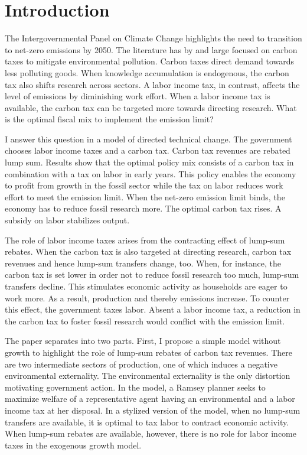 \clearpage
\section{Introduction}

The Intergovernmental Panel on Climate Change highlights the need to transition to net-zero emissions by 2050. The literature has by and large focused on carbon taxes to mitigate environmental pollution. Carbon taxes direct demand towards less polluting goods. When knowledge accumulation is endogenous, the carbon tax also shifts research across sectors. A labor income tax, in contrast, affects the level of emissions by diminishing work effort. When a labor income tax is available, the carbon tax can be targeted more towards directing research. 
What is the optimal fiscal mix to implement the emission limit?

I answer this question in a model of directed technical change. The government chooses labor income taxes and a carbon tax. Carbon tax revenues are rebated lump sum. Results show that the optimal policy mix consists of a carbon tax in combination with a tax on labor in early years. This policy enables the economy to profit from growth in the fossil sector while the tax on labor reduces work effort to meet the emission limit. When the net-zero emission limit binds, the economy has to reduce fossil research more. The optimal carbon tax rises. A subsidy on labor stabilizes output. 

The role of labor income taxes arises from the contracting effect of lump-sum rebates. 
When the carbon tax is also targeted at directing research, carbon tax revenues and hence lump-sum transfers change, too. When, for instance, the carbon tax is set lower in order not to reduce fossil research too much, lump-sum transfers decline. This stimulates economic activity as households are eager to work more. As a result, production and thereby emissions increase. To counter this effect, the government taxes labor. Absent a labor income tax, a reduction in the carbon tax to foster fossil research would conflict with the emission limit.

The paper separates into two parts. First, I propose a simple model without growth to highlight the role of lump-sum rebates of carbon tax revenues. There are two intermediate sectors of production, one of which induces a negative environmental externality. The environmental externality is the only distortion motivating government action. In the model, a Ramsey planner seeks to maximize welfare of a representative agent having  an environmental and a labor income tax at her disposal. In a stylized version of the model, when no lump-sum transfers are available, it is optimal to tax labor to contract economic activity. When lump-sum rebates are available, however, there is no role for labor income taxes in the exogenous growth model. 

